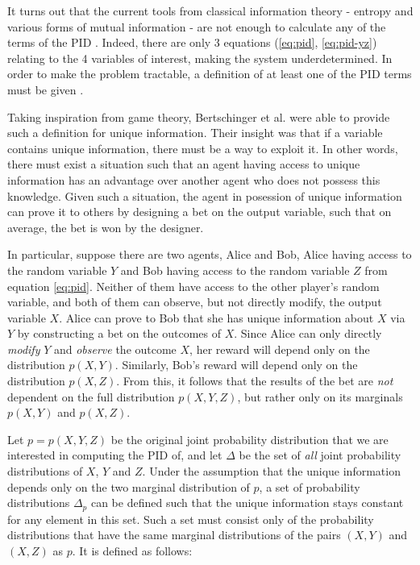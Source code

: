 \documentclass[12pt]{article}
\begin{document}
It turns out that the current tools from classical information theory - entropy and various forms of mutual information - are not enough to calculate any of the terms of the PID \cite{williams-beer}. Indeed, there are only 3 equations (\ref{eq:pid}, \ref{eq:pid-yz}) relating to the 4 variables of interest, making the system underdetermined. In order to make the problem tractable, a definition of at least one of the PID terms must be given \cite{bertschinger}.

Taking inspiration from game theory, Bertschinger et al. \cite{bertschinger} were able to provide such a definition for unique information. Their insight was that if a variable contains unique information, there must be a way to exploit it. In other words, there must exist a situation such that an agent having access to unique information has an advantage over another agent who does not possess this knowledge. Given such a situation, the agent in posession of unique information can prove it to others by designing a bet on the output variable, such that on average, the bet is won by the designer.

In particular, suppose there are two agents, Alice and Bob, Alice having access to the random variable $Y$ and Bob having access to the random variable $Z$ from equation \ref{eq:pid}. Neither of them have access to the other player's random variable, and both of them can observe, but not directly modify, the output variable $X$. Alice can prove to Bob that she has unique information about $X$ via $Y$ by constructing a bet on the outcomes of $X$. Since Alice can only directly \textit{modify} $Y$ and \textit{observe} the outcome $X$, her reward will depend only on the distribution $p(X,Y)$. Similarly, Bob's reward will depend only on the distribution $p(X,Z)$. From this, it follows that the results of the bet are \textit{not} dependent on the full distribution $p(X,Y,Z)$, but rather only on its marginals $p(X,Y)$ and $p(X,Z)$.

Let $p = p(X,Y,Z)$ be the original joint probability distribution  that we are interested in computing the PID of, and let $\Delta$ be the set of \textit{all} joint probability distributions of $X$, $Y$ and $Z$. Under the assumption that the unique information depends only on the two marginal distribution of $p$, a set of probability distributions $\Delta_p$ can be defined such that the unique information stays constant for any element in this set. Such a set must consist only of the probability distributions that have the same marginal distributions of the pairs $(X,Y)$ and $(X,Z)$ as $p$. It is defined as follows: 
\end{document}
